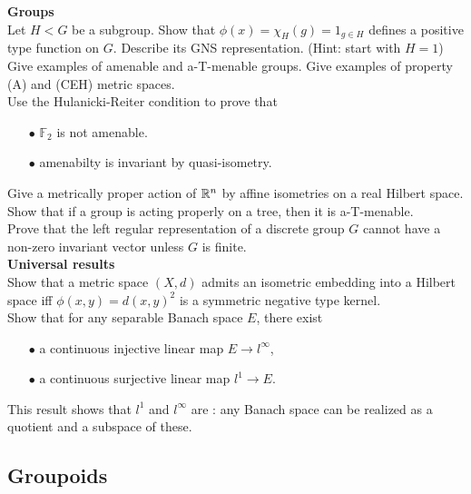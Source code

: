 \textbf{Groups} \\

Let $H<G$ be a subgroup. Show that $\phi(x)=\chi_H(g)= 1_{g\in H}$ defines a positive type function on $G$. Describe its GNS representation. (Hint: start with $H=1$)\\

Give examples of amenable and a-T-menable groups. Give examples of property (A) and (CEH) metric spaces.\\ 

Use the Hulanicki-Reiter condition to prove that
\begin{itemize}
\item[$\bullet$] $\mathbb F_2$ is not amenable.
\item[$\bullet$] amenabilty is invariant by quasi-isometry.	
\end{itemize}

Give a  metrically proper action of $\mathbb R^n$ by affine isometries on a real Hilbert space.\\

Show that if a group is acting properly on a tree, then it is a-T-menable.\\

Prove that the left regular representation of a discrete group $G$ cannot have a non-zero invariant vector unless $G$ is finite.\\

\textbf{Universal results} \\

Show that a metric space $(X,d)$ admits an isometric embedding into a Hilbert space iff $\phi(x,y) = d(x,y)^2$ is a symmetric negative type kernel.\\

Show that for any separable Banach space $E$, there exist
\begin{itemize}
\item[$\bullet$] a continuous injective linear map $E\rightarrow l^\infty$,
\item[$\bullet$] a continuous surjective linear map $l^1 \rightarrow E$.   
\end{itemize}
This result shows that $l^1$ and $l^\infty$ are : any Banach space can be realized as a quotient and a subspace of these.

\subsection{Groupoids}

